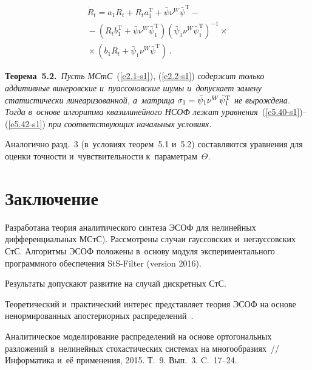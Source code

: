 \begin{multicols}{2}
\vspace*{-12pt}

\noindent
\begin{multline}
\dot R_t = a_1 R_t + R_t a_1^{\mathrm{T}} + \bar\psi \nu^W \bar\psi^{\mathrm{T}}
- {}\\
{}-\left(R_t b_1^{\mathrm{T}} +\bar\psi \nu^W\bar\psi_1^{\mathrm{T}}\right)
\left(\bar\psi_1 \nu^W\bar\psi_1^{\mathrm{T}}\right)^{-1} \times{}\\
{}\times
\left(b_1 R_t + \bar\psi_1 \nu^W\bar\psi^{\mathrm{T}}\right)\,.
\label{e5.42-s1}
\end{multline}


\noindent
\textbf{Теорема~5.2.}\ \textit{Пусть МСтС}~(\ref{e2.1-s1}), (\ref{e2.2-s1}) 
\textit{содержит только аддитивные винеровские и~пуассоновские шумы и~допускает 
замену статистически линеаризованной, а~матрица  $\si_1 \hm=\bar\psi_1 
\nu^W \bar\psi_1^{\mathrm{T}}$ не вырождена. Тогда в~основе алгоритма 
квазилинейного НСОФ лежат уравнения}~(\ref{e5.40-s1})--(\ref{e5.42-s1}) 
\textit{при соответствующих начальных условиях.}

\smallskip

Аналогично разд.~3 (в~условиях теорем~5.1 и~5.2) составляются уравнения 
для оценки точности и~чувствительности к~параметрам~$\Theta$.

\section{Заключение}

Разработана теория аналитического синтеза ЭСОФ для нелинейных дифференциальных 
МСтС). Рассмотрены случаи гауссовских 
и~негауссовских СтС. Алгоритмы ЭСОФ положены в~основу модуля экспериментального 
программного обеспечения  StS-Filter (version 2016).

Результаты допускают развитие на случай дискретных СтС.

Теоретический и~практический интерес представляет теория  ЭСОФ 
на основе ненормированных апостериорных распределений~\cite{10-s1}.


{\small\frenchspacing
 {%
 \begin{thebibliography}{99}

Аналитическое моделирование распределений на основе ортогональных
разложений в~нелинейных стохастических системах на многообразиях~//
Информатика и~её применения, 2015. Т.~9. Вып.~3. C.~17--24.



\end{thebibliography}}}
\end{multicols}
